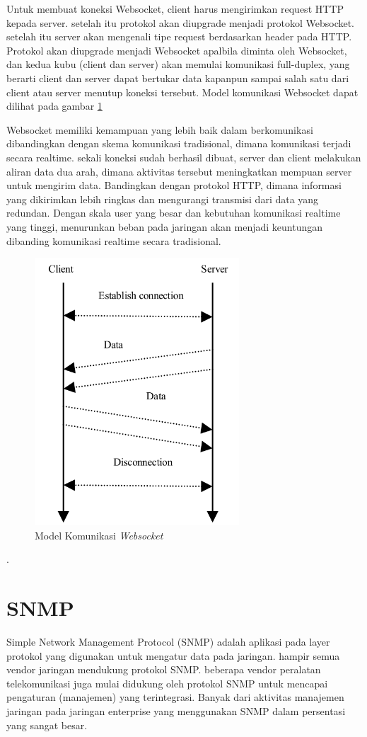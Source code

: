            	Untuk membuat koneksi Websocket, client harus mengirimkan request HTTP kepada server. setelah itu protokol akan diupgrade menjadi protokol Websocket. setelah itu server akan mengenali tipe request berdasarkan header pada HTTP. Protokol akan diupgrade menjadi Websocket apalbila diminta oleh Websocket, dan kedua kubu (client dan server) akan memulai komunikasi full-duplex, yang berarti client dan server dapat bertukar data kapanpun sampai salah satu dari client atau server menutup koneksi tersebut. Model komunikasi Websocket dapat dilihat pada gambar \ref{websocketmodel}
           		
           	Websocket memiliki kemampuan yang lebih baik dalam berkomunikasi dibandingkan dengan skema komunikasi tradisional, dimana komunikasi terjadi secara realtime. sekali koneksi sudah berhasil dibuat, server dan client melakukan aliran data dua arah, dimana aktivitas tersebut meningkatkan mempuan server untuk mengirim data. Bandingkan dengan protokol HTTP, dimana informasi yang dikirimkan lebih ringkas dan mengurangi transmisi dari data yang redundan. Dengan skala user yang besar dan kebutuhan komunikasi realtime yang tinggi, menurunkan beban pada jaringan akan menjadi keuntungan dibanding komunikasi realtime secara tradisional.
           	\begin{figure}[H]
           		\centering
           		\includegraphics[height=10cm]{Images/C-2/websocket.png}
           		\caption{Model Komunikasi \textit{Websocket}}
           		\label{websocketmodel}
           	\end{figure}
           	\cite{boettiger_introduction_2015}.
		\section{SNMP}
			Simple Network Management Protocol (SNMP) adalah aplikasi pada layer protokol yang digunakan untuk mengatur data pada jaringan. hampir semua vendor jaringan mendukung protokol SNMP. beberapa vendor peralatan telekomunikasi juga mulai didukung oleh protokol SNMP untuk mencapai pengaturan (manajemen) yang terintegrasi. Banyak dari aktivitas manajemen jaringan pada jaringan enterprise yang menggunakan SNMP dalam persentasi yang sangat besar.
			
